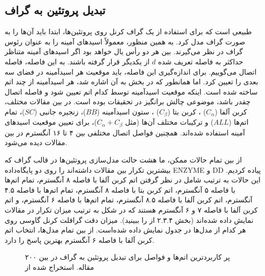 \subsection{تبدیل پروتئین به گراف}\label{sec:protein-to-graph}
طبیعی است که برای استفاده از یک گراف کرنل روی پروتئین‌ها، ابتدا باید آن‌ها را به صورت گراف مدل کرد. به همین منظور، معمولاً اسید‌های آمینه را به عنوان رئوس گراف در نظر می‌گیرند. بین هر دو رأس یال خواهد بود اگر اسیدهای آمینه متناظر حداکثر به فاصله تعریف شده $d$ از یکدیگر قرار گرفته باشند. به این فاصله، فاصله اتصال می‌گوییم. برای اندازه‌گیری این فاصله، باید موقعیت هر اسیدآمینه در فضای سه بعدی را تعیین کرد. اما همانطور که در بخش  به آن اشاره شد، هر اسیدآمینه از چند اتم ساخته شده است. اینکه موقعیت اسیدآمینه توسط کدام اتم تعیین شود و فاصله اتصال چقدر باشد، موضوعی چالش برانگیز در تحقیقات بوده است. در بین مقالات مختلف، کربن آلفا 
($C_\alpha$)
، کربن بتا
($C_\beta$)
، ستون اسیدآمینه ($BB$)، زنجیره جانبی ($SC$)، تمام اتم‌ها ($ALL$) و ترکیبات مختلف آن‌ها (مثل $C_\alpha+C_\beta$)، برای تعیین موقعیت اسید‌های آمینه استفاده شده‌اند. همچنین فواصل اتصال مختلفی بین ۴ تا ۱۶ آنگسترم در بین مقالات دیده می‌شود.

از بین تمام حالات ممکن، ما هشت حالت مدل‌سازی پروتئین‌ها در قالب گراف که بیشترین تکرار بین مقالات داشته‌اند را روی دو پایگاه‌داده ENZYME و DD پیاده کردیم. این حالات به ترتیب شامل در نظر گرفتن اتم کربن آلفا با فاصله ۸ آنگسترم، تمام اتم‌ها با فاصله ۵ آنگسترم، اتم کربن بتا با فاصله ۸ آنگسترم، تمام اتم‌ها با فاصله ۴.۵ آنگسترم، اتم کربن آلفا با فاصله ۸.۵ آنگسترم، تمام اتم‌ها با فاصله ۶ آنگسترم، و اتم کربن آلفا با فاصله ۷ و ۶ آنگسترم هستند که در شکل  به ترتیب میزان تکرار در مقالات نمایش داده شده‌اند (بخش ۲.۳.۴ از  را ببینید). میزان دقت گرافلت کرنل گاوسی روی هر کدام از مدل‌ها در جدول  نمایش داده شده‌است. از بین تمام مدل‌ها، انتخاب اتم کربن آلفا با فاصله ۶ آنگسترم بهترین پاسخ را دارد.

\begin{figure}[ht]
\caption{پر کاربرد‌ترین اتم‌ها و فواصل برای تبدیل پروتئین به گراف در بین ۲۰۰ مقاله. استخراج شده از }
\label{fig:rig-occurance}
\end{figure}

